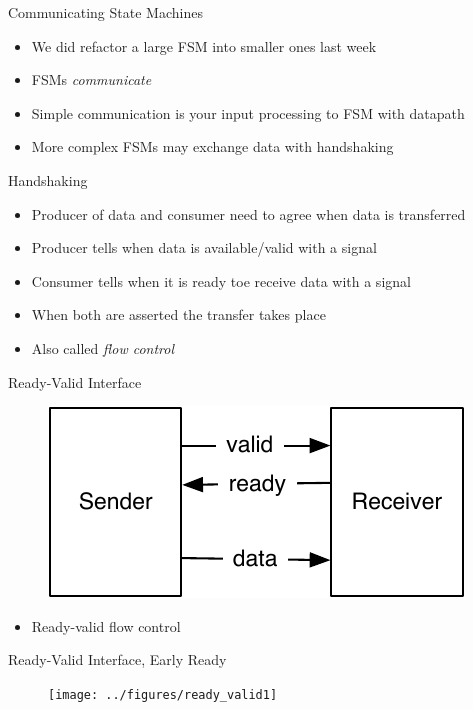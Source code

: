\begin{frame}[fragile]{Communicating State Machines}
\begin{itemize}
\item We did refactor a large FSM into smaller ones last week
\item FSMs \emph{communicate}
\item Simple communication is your input processing to FSM with datapath
\item More complex FSMs may exchange data with handshaking
\end{itemize}
\end{frame}

\begin{frame}[fragile]{Handshaking}
\begin{itemize}
\item Producer of data and consumer need to agree when data is transferred
\item Producer tells when data is available/valid with a  signal
\item Consumer tells when it is ready toe receive data with a  signal
\item When both are asserted the transfer takes place
\item Also called \emph{flow control}
\end{itemize}
\end{frame}

\begin{frame}[fragile]{Ready-Valid Interface}
\begin{figure}
  \includegraphics[scale=\scale]{../figures/readyvalid}
\end{figure}
\begin{itemize}
\item Ready-valid flow control
\end{itemize}
\end{frame}

\begin{frame}[fragile]{Ready-Valid Interface, Early Ready}
\begin{figure}
  \texttt{[image: ../figures/ready\_valid1]}
\end{figure}
\end{frame}


